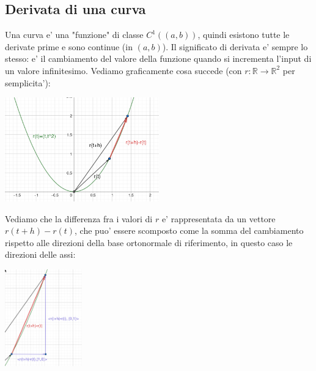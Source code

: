 \documentclass{report}
\begin{document}
\subsection{Derivata di una curva}
Una curva e' una "funzione" di classe $ C^1((a,b)) $, quindi esistono tutte le derivate prime e sono continue (in $ (a,b) $). Il significato di derivata e' sempre lo stesso: e' il cambiamento del valore della funzione quando si incrementa l'input di un valore infinitesimo. Vediamo graficamente cosa succede (con $ r:\mathbb{R}\to\mathbb{R}^2 $ per semplicita'):
\begin{center}
    \includegraphics[width=0.5\textwidth]{ img/2024-05-05-15-17-31.png}
\end{center}
Vediamo che la differenza fra i valori di $ r $ e' rappresentata da un vettore $ r(t+h)-r(t) $, che puo' essere scomposto come la somma del cambiamento rispetto alle direzioni della base ortonormale di riferimento, in questo caso le direzioni delle assi:\\
\begin{center}
\includegraphics[width=0.25\textwidth]{img/2024-05-05-15-54-02.png}
\end{center}
\end{document}

